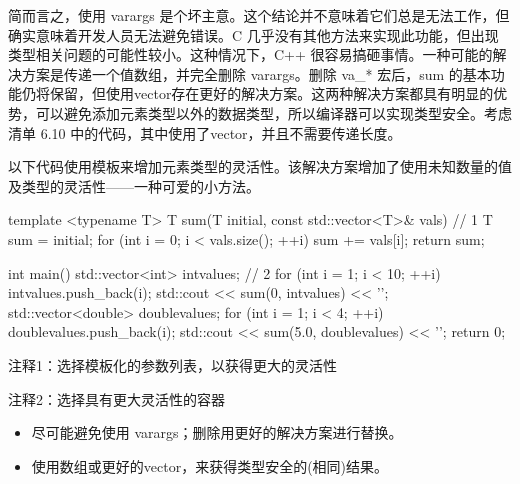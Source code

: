 
简而言之，使用 varargs 是个坏主意。这个结论并不意味着它们总是无法工作，但确实意味着开发人员无法避免错误。C 几乎没有其他方法来实现此功能，但出现类型相关问题的可能性较小。这种情况下，C++ 很容易搞砸事情。一种可能的解决方案是传递一个值数组，并完全删除 varargs。删除 va\_* 宏后，sum 的基本功能仍将保留，但使用vector存在更好的解决方案。这两种解决方案都具有明显的优势，可以避免添加元素类型以外的数据类型，所以编译器可以实现类型安全。考虑清单 6.10 中的代码，其中使用了vector，并且不需要传递长度。

以下代码使用模板来增加元素类型的灵活性。该解决方案增加了使用未知数量的值及类型的灵活性——一种可爱的小方法。


\begin{cpp}
template <typename T>
T sum(T initial, const std::vector<T>& vals) { // 1
  T sum = initial;
  for (int i = 0; i < vals.size(); ++i)
    sum += vals[i];
  return sum;
}

int main() {
  std::vector<int> intvalues; // 2
  for (int i = 1; i < 10; ++i)
    intvalues.push_back(i);
  std::cout << sum(0, intvalues) << '\n';
  std::vector<double> doublevalues;
  for (int i = 1; i < 4; ++i)
    doublevalues.push_back(i);
  std::cout << sum(5.0, doublevalues) << '\n';
  return 0;
}
\end{cpp}

{\footnotesize
注释1：选择模板化的参数列表，以获得更大的灵活性

注释2：选择具有更大灵活性的容器
}


\begin{itemize}
\item
尽可能避免使用 varargs；删除用更好的解决方案进行替换。

\item
使用数组或更好的vector，来获得类型安全的(相同)结果。
\end{itemize}
